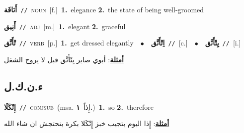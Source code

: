 \documentclass[10pt,a4paper,twoside]{article} %
\begin{document}
\begin{multicols}{2}
{\setlength\topsep{0pt}\textbf{\foreignlanguage{arabic}{أَنَاقَة}}\ {\color{gray}\texttt{//}\color{black}}\ \textsc{noun}\ [f.]\ \textbf{1.}~elegance  \textbf{2.}~the state of being well-groomed\ } \vspace{2mm}

{\setlength\topsep{0pt}\textbf{\foreignlanguage{arabic}{أَنِيق}}\ {\color{gray}\texttt{//}\color{black}}\ \textsc{adj}\ [m.]\ \textbf{1.}~elegant  \textbf{2.}~graceful\ } \vspace{2mm}

{\setlength\topsep{0pt}\textbf{\foreignlanguage{arabic}{تْأَنَّق}}\ {\color{gray}\texttt{//}\color{black}}\ \textsc{verb}\ [p.]\ \textbf{1.}~get dressed elegantly\ \ $\bullet$\ \ \setlength\topsep{0pt}\textbf{\foreignlanguage{arabic}{اِتْأَنَّق}}\ {\color{gray}\texttt{//}\color{black}}\ [c.]\ \ $\bullet$\ \ \setlength\topsep{0pt}\textbf{\foreignlanguage{arabic}{يِتْأَنَّق}}\ {\color{gray}\texttt{//}\color{black}}\ [i.]\  \begin{flushright}\color{gray}\foreignlanguage{arabic}{\textbf{\underline{\foreignlanguage{arabic}{أمثلة}}}: أبوي صاير يِتْأَنَّق قبل لا يروح الشغل}\end{flushright}\color{black}} \vspace{2mm}

\vspace{-3mm}
\subsection*{\color{blue}\foreignlanguage{arabic}{ء.ن.ك.ل}\color{blue}{ (ntws)}} 

{\setlength\topsep{0pt}\textbf{\foreignlanguage{arabic}{إِنْكَلَا}}\ {\color{gray}\texttt{//}\color{black}}\ \textsc{conj\textunderscore sub}\ \color{gray}(msa. \foreignlanguage{arabic}{إِذاً}~\foreignlanguage{arabic}{\textbf{١.}})\color{black}\ \textbf{1.}~so  \textbf{2.}~therefore\  \begin{flushright}\color{gray}\foreignlanguage{arabic}{\textbf{\underline{\foreignlanguage{arabic}{أمثلة}}}: إِذا اليوم بتجيب خبز إِنْكَلا بكرة بنحتجش ان شاء الله}\end{flushright}\color{black}} \vspace{2mm}


\end{multicols}
\end{document}
